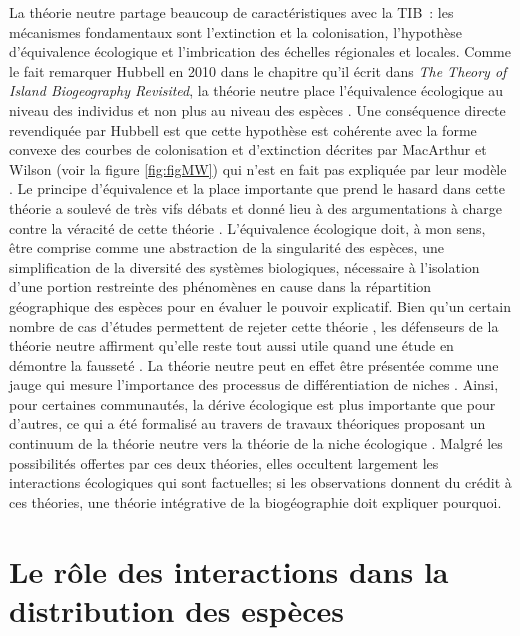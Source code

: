 La théorie neutre partage beaucoup de caractéristiques avec la TIB~: les
mécanismes fondamentaux sont l'extinction et la colonisation,
l'hypothèse d'équivalence écologique et l'imbrication des échelles
régionales et locales. Comme le fait remarquer Hubbell en 2010 dans le
chapitre qu'il écrit dans \emph{The Theory of Island Biogeography
Revisited}, la théorie neutre place l'équivalence écologique au niveau
des individus et non plus au niveau des espèces \citep{Hubbell2010}. Une
conséquence directe revendiquée par Hubbell est que cette hypothèse est
cohérente avec la forme convexe des courbes de colonisation et
d'extinction décrites par MacArthur et Wilson (voir la figure
\ref{fig:figMW}) qui n'est en fait pas expliquée par leur modèle
\citep{Hubbell2010}. Le principe d'équivalence et la place importante
que prend le hasard dans cette théorie a soulevé de très vifs débats et
donné lieu à des argumentations à charge contre la véracité de cette
théorie \citep[voir par exemple][]{McGill2003, Ricklefs2003}.
L'équivalence écologique doit, à mon sens, être comprise comme une
abstraction de la singularité des espèces, une simplification de la
diversité des systèmes biologiques, nécessaire à l'isolation d'une
portion restreinte des phénomènes en cause dans la répartition
géographique des espèces pour en évaluer le pouvoir explicatif. Bien
qu'un certain nombre de cas d'études permettent de rejeter cette théorie
\citep{McGill2003, John2007}, les défenseurs de la théorie neutre
affirment qu'elle reste tout aussi utile quand une étude en démontre la
fausseté \citep{Rosindell2012}. La théorie neutre peut en effet être
présentée comme une jauge qui mesure l'importance des processus de
différentiation de niches \citep{Wennekes2012}. Ainsi, pour certaines
communautés, la dérive écologique est plus importante que pour d'autres,
ce qui a été formalisé au travers de travaux théoriques proposant un
continuum de la théorie neutre vers la théorie de la niche écologique
\citep{Gravel2006a}. Malgré les possibilités offertes par ces deux
théories, elles occultent largement les interactions écologiques qui
sont factuelles; si les observations donnent du crédit à ces théories,
une théorie intégrative de la biogéographie doit expliquer pourquoi.

\section*{Le rôle des interactions dans la distribution des
espèces}\label{le-ruxf4le-des-interactions-dans-la-distribution-des-espuxe8ces}

